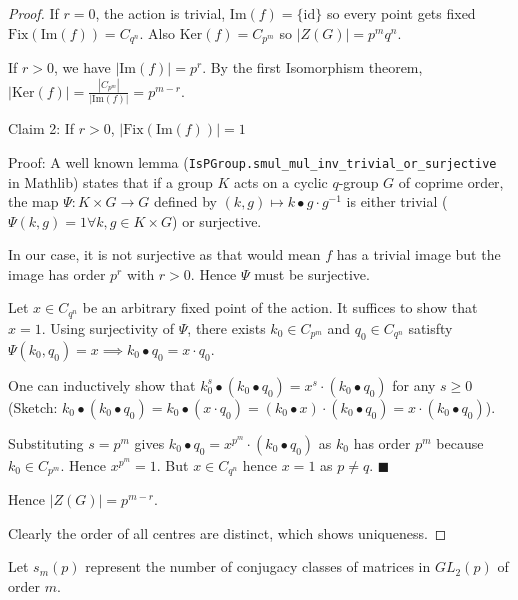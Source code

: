 \documentclass[a4paper,11pt, titlepage]{article}
\theoremstyle{remark}
\begin{document}
\begin{proof}
    If $r = 0$, the action is trivial, $\text{Im}(f) = \{\text{id}\}$ so every point gets fixed $\text{Fix}(\text{Im}(f)) = C_{q^n}$. Also $\text{Ker}(f) = C_{p^m}$ so $|Z(G)| = p^m q^n$.

    If $r > 0$, we have $|\text{Im}(f)| = p^r$. By the first Isomorphism theorem, $|\text{Ker}(f)| = \frac{|C_{p^m}|}{|\text{Im}(f)|} = p^{m - r}$.

    Claim 2: If $r > 0$, $|\text{Fix}(\text{Im}(f))| = 1$

    Proof: A well known lemma (\texttt{IsPGroup.smul_mul_inv_trivial_or_surjective} in Mathlib) states that if a group $K$ acts on a cyclic $q$-group $G$ of coprime order, the map $\Psi : K \times G \to G$ defined by $(k, g) \mapsto k \bullet g \cdot g^{-1}$ is either trivial ($\Psi(k, g) = 1 \forall k, g \in K \times G$) or surjective. 
    
    In our case, it is not surjective as that would mean $f$ has a trivial image but the image has order $p^r$ with $r > 0$. Hence $\Psi$ must be surjective. 
    
    Let $x \in C_{q^n}$ be an arbitrary fixed point of the action. It suffices to show that $x = 1$. Using surjectivity of $\Psi$, there exists $k_0 \in C_{p^m}$ and $q_0 \in C_{q^n}$ satisfty $\Psi(k_0, q_0) = x \implies k_0 \bullet q_0 = x \cdot q_0$. 
    
    One can inductively show that $k_0^s \bullet (k_0 \bullet q_0) = x^s \cdot (k_0 \bullet q_0)$ for any $s \geq 0$ (Sketch: $k_0 \bullet (k_0 \bullet q_0) = k_0 \bullet (x \cdot q_0) = (k_0 \bullet x) \cdot (k_0 \bullet q_0) = x \cdot (k_0 \bullet q_0)$). 
    
    Substituting $s = p^m$ gives $k_0 \bullet q_0 = x^{p^m} \cdot (k_0 \bullet q_0)$ as $k_0$ has order $p^m$ because $k_0 \in C_{p^m}$. Hence $x^{p^m} = 1$. But $x \in C_{q^n}$ hence $x = 1$ as $p \neq q$. $\blacksquare$

    Hence $|Z(G)| = p^{m - r}$.

    Clearly the order of all centres are distinct, which shows uniqueness.
\end{proof}

Let $s_m(p)$ represent the number of conjugacy classes of matrices in $GL_2(p)$ of order $m$.
\end{document}
